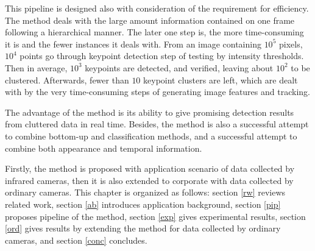 This pipeline is designed also with consideration of the requirement for efficiency.  The method deals with the large amount information contained on one frame following a hierarchical manner. The later one step is, the more time-consuming it is  and the fewer instances it deals with. From an image containing $10^5$ pixels, $10^4$ points go through keypoint detection step of testing by intensity thresholds. Then in average, $10^3$ keypoints are detected, and verified, leaving about $10^2$ to be clustered. Afterwards, fewer than $10$ keypoint clusters are left, which are dealt with by the very time-consuming steps of generating image features and tracking.

The advantage of the method is its ability to give promising detection results from cluttered data in real time. Besides, the method is also a successful attempt to combine bottom-up and classification methods, and a successful attempt to combine both appearance and temporal information.


Firstly, the method is proposed with application scenario of data collected by infrared cameras, then it is also extended to corporate with data collected by ordinary cameras.
This chapter is organized as follows: section \ref{rw} reviews related work, section \ref{ab} introduces application background, section \ref{pip} proposes pipeline of the method, section \ref{exp} gives experimental results, section \ref{ord} gives results by extending the method for data collected by ordinary cameras, and section \ref{conc} concludes.





 








